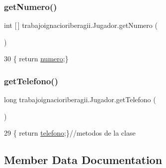\subsubsection{\texorpdfstring{get\+Numero()}{getNumero()}}
{\footnotesize\ttfamily int \mbox{[}$\,$\mbox{]} trabajoignacioriberagii.\+Jugador.\+get\+Numero (\begin{DoxyParamCaption}{ }\end{DoxyParamCaption})\hspace{0.3cm}{\ttfamily [inline]}}


\begin{DoxyCode}
30 \{ \textcolor{keywordflow}{return} \mbox{\hyperlink{classtrabajoignacioriberagii_1_1_jugador_a9c212c71c30fe0722972df3a966b5e07}{numero}};\}
\end{DoxyCode}
\mbox{\label{classtrabajoignacioriberagii_1_1_jugador_a3c851a0f1eea2ac9a92681d723e1f02f}} 
\subsubsection{\texorpdfstring{get\+Telefono()}{getTelefono()}}
{\footnotesize\ttfamily long trabajoignacioriberagii.\+Jugador.\+get\+Telefono (\begin{DoxyParamCaption}{ }\end{DoxyParamCaption})\hspace{0.3cm}{\ttfamily [inline]}}


\begin{DoxyCode}
29 \{ \textcolor{keywordflow}{return} \mbox{\hyperlink{classtrabajoignacioriberagii_1_1_jugador_ae739daa3303ea17e6f041ad860b04b3e}{telefono}};\}\textcolor{comment}{//metodos de la clase}
\end{DoxyCode}


\subsection{Member Data Documentation}
\mbox{\label{classtrabajoignacioriberagii_1_1_jugador_aae9c316bdd5626ce8e14bb067221404e}} 
